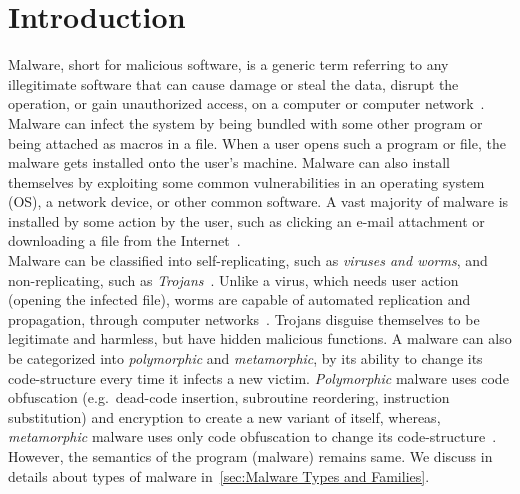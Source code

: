 \chapter{Introduction}\label{chapter:introduction}
Malware, short for malicious software, is a generic term referring to any illegitimate software that can cause damage or steal the data, disrupt the operation, or gain unauthorized access, on a computer or computer network~\cite[]{ciscodif}.
Malware can infect the system by being bundled with some other program or being attached as macros in a file.
When a user opens such a program or file, the malware gets installed onto the user's machine.
Malware can also install themselves by exploiting some common vulnerabilities in an operating system (OS), a network device, or other common software.
A vast majority of malware is installed by some action by the user, such as clicking an e-mail attachment or downloading a file from the Internet~\cite[]{ciscodif}.\\

Malware can be classified into self-replicating, such as \emph{viruses and worms}, and non-replicating, such as \emph{Trojans}~\cite[]{malsoft}.
Unlike a virus, which needs user action (opening the infected file), worms are capable of automated replication and propagation, through computer networks~\cite[]{malsoft}.
Trojans disguise themselves to be legitimate and harmless, but have hidden malicious functions.
A malware can also be categorized into \emph{polymorphic} and \emph{metamorphic}, by its ability to change its code-structure every time it infects a new victim.
\emph{Polymorphic} malware uses code obfuscation (e.g.\ dead-code insertion, subroutine reordering, instruction substitution) and encryption to create a new variant of itself, whereas,
\emph{metamorphic} malware uses only code obfuscation to change its code-structure~\cite[]{rad2011evolution,rad2012camouflage}.
However, the semantics of the program (malware) remains same.
We discuss in details about types of malware in~\autoref{sec:Malware Types and Families}.\\

